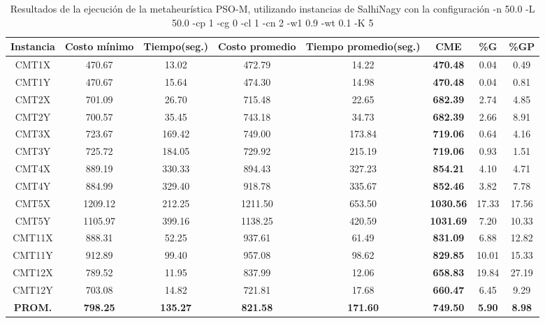 \begin{table}[h]
\caption{Resultados de la ejecución de la metaheurística PSO-M, utilizando instancias de SalhiNagy con la configuración -n 50.0 -L 50.0 -cp 1 -cg 0 -cl 1 -cn 2 -w1 0.9 -wt 0.1 -K 5}
\centering
\small
\begin{tabular}{c c c c c c c c}
\hline\hline
Instancia & Costo mínimo & Tiempo(seg.) & Costo promedio & Tiempo promedio(seg.) & CME & \%G & \%GP \\ [0.5ex]
\hline
CMT1X & 470.67 & 13.02 & 
472.79 & 14.22 & \bf{470.48} & 
0.04 & 0.49\\CMT1Y & 470.67 & 15.64 & 
474.30 & 14.98 & \bf{470.48} & 
0.04 & 0.81\\CMT2X & 701.09 & 26.70 & 
715.48 & 22.65 & \bf{682.39} & 
2.74 & 4.85\\CMT2Y & 700.57 & 35.45 & 
743.18 & 34.73 & \bf{682.39} & 
2.66 & 8.91\\CMT3X & 723.67 & 169.42 & 
749.00 & 173.84 & \bf{719.06} & 
0.64 & 4.16\\CMT3Y & 725.72 & 184.05 & 
729.92 & 215.19 & \bf{719.06} & 
0.93 & 1.51\\CMT4X & 889.19 & 330.33 & 
894.43 & 327.23 & \bf{854.21} & 
4.10 & 4.71\\CMT4Y & 884.99 & 329.40 & 
918.78 & 335.67 & \bf{852.46} & 
3.82 & 7.78\\CMT5X & 1209.12 & 212.25 & 
1211.50 & 653.50 & \bf{1030.56} & 
17.33 & 17.56\\CMT5Y & 1105.97 & 399.16 & 
1138.25 & 420.59 & \bf{1031.69} & 
7.20 & 10.33\\CMT11X & 888.31 & 52.25 & 
937.61 & 61.49 & \bf{831.09} & 
6.88 & 12.82\\CMT11Y & 912.89 & 99.40 & 
957.08 & 98.62 & \bf{829.85} & 
10.01 & 15.33\\CMT12X & 789.52 & 11.95 & 
837.99 & 12.06 & \bf{658.83} & 
19.84 & 27.19\\CMT12Y & 703.08 & 14.82 & 
721.81 & 17.68 & \bf{660.47} & 
6.45 & 9.29\\\bf{PROM.} & 
\bf{798.25} & \bf{135.27} & \bf{821.58} & \bf{171.60} & \bf{749.50} & \bf{5.90} & \bf{8.98}\\[1ex]\hline
\end{tabular}
\label{table:nonlin}
\end{table}
